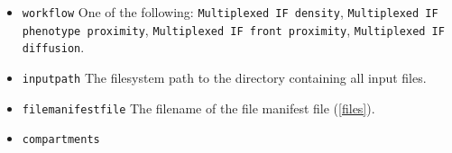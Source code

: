 \documentclass[14pt]{article}
\begin{document}
\begin{itemize}
  \itemsep0em
  \item[]{ \colorbox{yellow!25}{\texttt{workflow}} One of the following: \colorbox{gray!20}{\texttt{Multiplexed IF density}}, \colorbox{gray!20}{\texttt{Multiplexed IF phenotype proximity}}, \colorbox{gray!20}{\texttt{Multiplexed IF front proximity}}, \colorbox{gray!20}{\texttt{Multiplexed IF diffusion}}}.
  \item[]{ \colorbox{yellow!25}{\texttt{input{\textunderscore}path}} The filesystem path to the directory containing all input files.}
  \item[]{ \colorbox{yellow!25}{\texttt{file{\textunderscore}manifest{\textunderscore}file}} The filename of the file manifest file (\ref{files}).}
  \item[]{ \colorbox{yellow!25}{\texttt{compartments}} }
\end{itemize}
\end{document}
